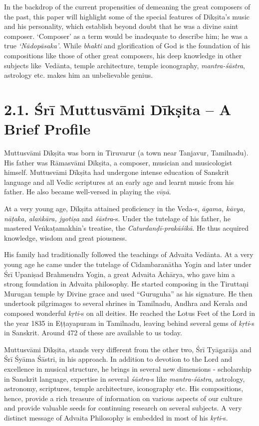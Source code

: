 In the backdrop of the current propensities of demeaning the great composers of the past, this paper will highlight some of the special features of Dīkṣita’s music and his personality, which establish beyond doubt that he was a divine saint composer. ‘Composer’ as a term would be inadequate to describe him; he was a true \textit{‘Nādopāsaka’}. While \textit{bhakti} and glorification of God is the foundation of his compositions like those of other great composers, his deep knowledge in other subjects like Vedānta, temple architecture, temple iconography, \textit{mantra-śāstra}, astrology etc. makes him an unbelievable genius.


\section*{2.1. Śrī Muttusvāmi Dīkṣita – A Brief Profile}

Muttusvāmi Dīkṣita was born in Tiruvarur (a town near Tanjavur, Tamilnadu). His father was Rāmasvāmi Dīkṣita, a composer, musician and musicologist himself. Muttusvāmi Dīkṣita had undergone intense education of Sanskrit language and all Vedic scriptures at an early age and learnt music from his father. He also became well-versed in playing the \textit{vīṇā}.

At a very young age, Dīkṣita attained proficiency in the Veda-s, \textit{āgama, kāvya, nāṭaka, alaṅkāra, jyotiṣa} and \textit{śāstra}-s. Under the tutelage of his father, he mastered Veṅkaṭamakhin’s treatise, the \textit{Caturdanḍī-prakāśikā}. He thus acquired knowledge, wisdom and great piousness.

His family had traditionally followed the teachings of Advaita Vedānta. At a very young age he came under the tutelage of Cidambaranātha Yogin and later under Śrī Upaniṣad Brahmendra Yogin, a great Advaita Āchārya, who gave him a strong foundation in Advaita philosophy. He started composing in the Tiruttaṇi Murugan temple by Divine grace and used “Guruguha” as his signature. He then undertook pilgrimages to several shrines in Tamilnadu, Andhra and Kerala and composed wonderful \textit{kṛti}-s on all deities. He reached the Lotus Feet of the Lord in the year 1835 in Eṭṭayapuram in Tamilnadu, leaving behind several gems of \textit{kṛti}-s in Sanskrit. Around 472 of these are available to us today.

Muttusvāmi Dīkṣita, stands very different from the other two, Śrī Tyāgarāja and Śrī Śyāma Śāstri, in his approach. In addition to devotion to the Lord and excellence in musical structure, he brings in several new dimensions - scholarship in Sanskrit language, expertise in several \textit{śāstra}-s like \textit{mantra-śāstra}, astrology, astronomy, scriptures, temple architecture, iconography etc. His compositions, hence, provide a rich treasure of information on various aspects of our culture and provide valuable seeds for continuing research on several subjects. A very distinct message of Advaita Philosophy is embedded in most of his \textit{kṛti}-s.


